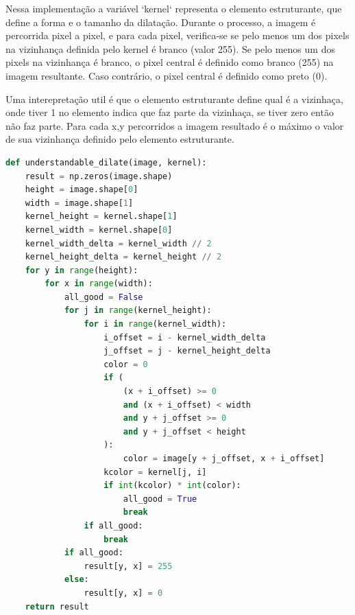 \documentclass[english, 
               brazil, 
               bsc] %
               {dcomp-abntex2}
\begin{document}
 Nessa implementação a variável `kernel` representa o elemento estruturante, que define a forma e o tamanho da dilatação. Durante o processo, a imagem é percorrida pixel a pixel, e para cada pixel, verifica-se se pelo menos um dos pixels na vizinhança definida pelo kernel é branco (valor 255). Se pelo menos um dos pixels na vizinhança é branco, o pixel central é definido como branco (255) na imagem resultante. Caso contrário, o pixel central é definido como preto (0).

 Uma interepretação util é que o elemento estruturante define qual é a vizinhaça, onde tiver 1 no elemento indica que faz parte da vizinhaça, se tiver zero então não faz parte. Para cada x,y percorridos a imagem resultado é o máximo o valor de sua vizinhança definido pelo elemento estruturante.

\begin{codigo}[h]
  \caption{\small .}
 \label{udilate}
\begin{lstlisting}[language=python]
def understandable_dilate(image, kernel):
    result = np.zeros(image.shape)
    height = image.shape[0]
    width = image.shape[1]
    kernel_height = kernel.shape[1]
    kernel_width = kernel.shape[0]
    kernel_width_delta = kernel_width // 2
    kernel_height_delta = kernel_height // 2
    for y in range(height):
        for x in range(width):
            all_good = False
            for j in range(kernel_height):
                for i in range(kernel_width):
                    i_offset = i - kernel_width_delta
                    j_offset = j - kernel_height_delta
                    color = 0
                    if (
                        (x + i_offset) >= 0
                        and (x + i_offset) < width
                        and y + j_offset >= 0
                        and y + j_offset < height
                    ):
                        color = image[y + j_offset, x + i_offset]
                    kcolor = kernel[j, i]
                    if int(kcolor) * int(color):
                        all_good = True
                        break
                if all_good:
                    break
            if all_good:
                result[y, x] = 255
            else:
                result[y, x] = 0
    return result
\end{lstlisting}
\end{codigo}

\end{document}
